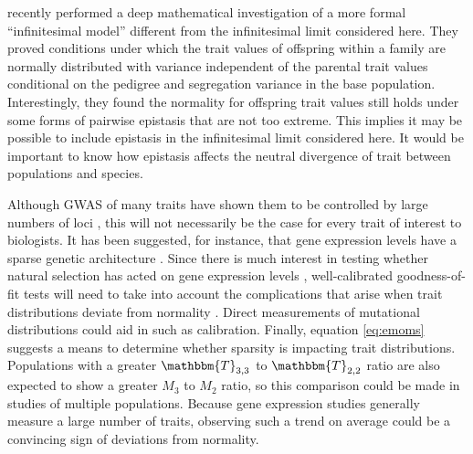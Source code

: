 \citet{Barton2017} recently performed a deep mathematical investigation of a
more formal ``infinitesimal model'' different from the infinitesimal limit
considered here. They proved conditions under which the trait values of
offspring within a family are normally distributed with variance independent of
the parental trait values conditional on the pedigree and segregation variance
in the base population. Interestingly, they found the normality for offspring
trait values still holds under some forms of pairwise epistasis that are not too
extreme. This implies it may be possible to include epistasis in the
infinitesimal limit considered here. It would be important to know how epistasis
affects the neutral divergence of trait between populations and species.

Although GWAS of many traits have shown them to be controlled by large numbers
of loci \citep{Boyle2017}, this will not necessarily be the case for every trait
of interest to biologists. It has been suggested, for instance, that gene
expression levels have a sparse genetic architecture \citep{Wheeler2016}. Since
there is much interest in testing whether natural selection has acted on gene
expression levels \citep{Whitehead2006,Gilad2006,Yang2017}, well-calibrated
goodness-of-fit tests will need to take into account the complications that
arise when trait distributions deviate from normality \citep{Khaitovich2005}.
Direct measurements of mutational distributions \citep{Gruber2012,Metzger2016}
could aid in such as calibration. Finally, equation \eqref{eq:emoms} suggests a
means to determine whether sparsity is impacting trait distributions.
Populations with a greater $\mathbbm{T}_{3,3}$ to $\mathbbm{T}_{2,2}$ ratio are
also expected to show a greater $M_3$ to $M_2$ ratio, so this comparison could
be made in studies of multiple populations. Because gene expression studies
generally measure a large number of traits, observing such a trend on average
could be a convincing sign of deviations from normality.


